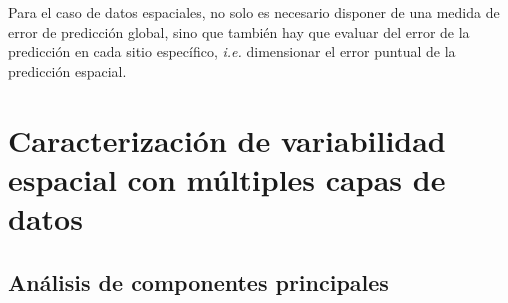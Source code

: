 \documentclass[11pt,b5paper,]{krantz}
\begin{document}
Para el caso de datos espaciales, no solo es necesario disponer de una
medida de error de predicción global, sino que también hay que evaluar
del error de la predicción en cada sitio específico, \emph{i.e.}
dimensionar el error puntual de la predicción espacial.

\chapter{Caracterización de variabilidad espacial con múltiples capas de
datos}\label{caracterizaciuxf3n-de-variabilidad-espacial-con-muxfaltiples-capas-de-datos}

\section{Análisis de componentes
principales}\label{anuxe1lisis-de-componentes-principales}
\end{document}
